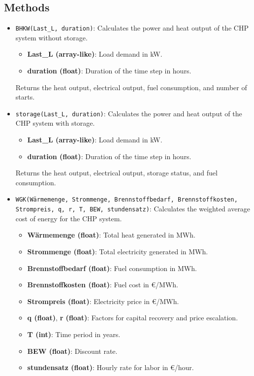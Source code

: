 \subsection{Methods}
\begin{itemize}
    \item \texttt{BHKW(Last\_L, duration)}: Calculates the power and heat output of the CHP system without storage.
    \begin{itemize}
        \item \textbf{Last\_L (array-like)}: Load demand in kW.
        \item \textbf{duration (float)}: Duration of the time step in hours.
    \end{itemize}
    Returns the heat output, electrical output, fuel consumption, and number of starts.

    \item \texttt{storage(Last\_L, duration)}: Calculates the power and heat output of the CHP system with storage.
    \begin{itemize}
        \item \textbf{Last\_L (array-like)}: Load demand in kW.
        \item \textbf{duration (float)}: Duration of the time step in hours.
    \end{itemize}
    Returns the heat output, electrical output, storage status, and fuel consumption.

    \item \texttt{WGK(Wärmemenge, Strommenge, Brennstoffbedarf, Brennstoffkosten, Strompreis, q, r, T, BEW, stundensatz)}: Calculates the weighted average cost of energy for the CHP system.
    \begin{itemize}
        \item \textbf{Wärmemenge (float)}: Total heat generated in MWh.
        \item \textbf{Strommenge (float)}: Total electricity generated in MWh.
        \item \textbf{Brennstoffbedarf (float)}: Fuel consumption in MWh.
        \item \textbf{Brennstoffkosten (float)}: Fuel cost in €/MWh.
        \item \textbf{Strompreis (float)}: Electricity price in €/MWh.
        \item \textbf{q (float)}, \textbf{r (float)}: Factors for capital recovery and price escalation.
        \item \textbf{T (int)}: Time period in years.
        \item \textbf{BEW (float)}: Discount rate.
        \item \textbf{stundensatz (float)}: Hourly rate for labor in €/hour.
    \end{itemize}


\end{itemize}
